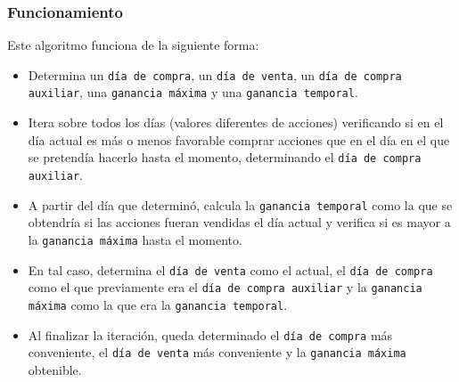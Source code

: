 \documentclass[a4paper, 10pt]{article}
\def\code#1{\texttt{#1}}
\begin{document}
            \subsubsection{Funcionamiento}
                Este algoritmo funciona de la siguiente forma:
                \begin{itemize}
                    \item Determina un \code{día de compra}, un \code{día de venta}, un \code{día de compra auxiliar},
                    una \code{ganancia máxima} y una \code{ganancia temporal}.
                    \item Itera sobre todos los días (valores diferentes de acciones) verificando si
                    en el día actual es más o menos favorable comprar acciones que en el día en el
                    que se pretendía hacerlo hasta el momento, determinando el \code{día de compra auxiliar}.
                    \item A partir del día que determinó, calcula la \code{ganancia temporal} como la que se obtendría
                    si las acciones fueran vendidas el día actual y verifica si es mayor a la \code{ganancia máxima}
                    hasta el momento.
                    \item En tal caso, determina el \code{día de venta} como el actual, el \code{día de compra}
                    como el que previamente era el \code{día de compra auxiliar} y la \code{ganancia máxima} como
                    la que era la \code{ganancia temporal}.
                    \item Al finalizar la iteración, queda determinado el \code{día de compra} más conveniente, el
                    \code{día de venta} más conveniente y la \code{ganancia máxima} obtenible.
                \end{itemize}
\end{document}
